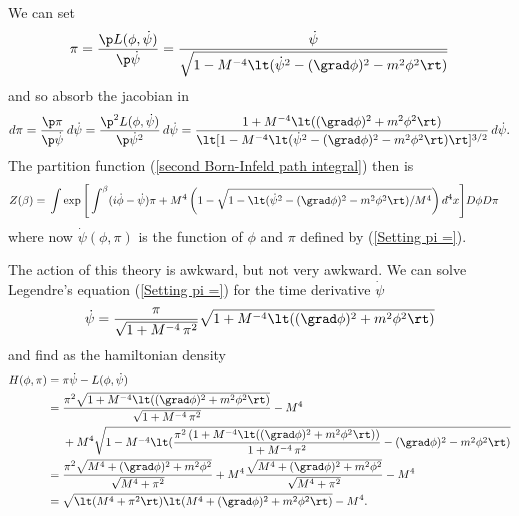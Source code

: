 \documentclass[prd,preprint,floatfix,showpacs]{revtex4-1}
\begin{document}
\par
We can set
\begin{equation}
\pi ={} \frac{ \p  L(\phi, \dot \psi)  }{ \p \dot \psi } = 
\frac{\dot \psi}
{\sqrt{ 1-  M^{-4} \lt(\dot \psi^2 
- (\grad \phi)^2 - m^2 \phi^2 \rt) }}
\label {Setting pi =}
\end{equation}
and so absorb the jacobian in
\begin{equation}
d\pi ={} \frac{\p \pi}{\p \dot \psi} \, d \dot \psi
= \frac{ \p^2  L(\phi, \dot \psi) }{ \p \dot \psi^2  } \, d \dot \psi
={} \frac{1 + M^{-4}\lt((\grad \phi)^2 + m^2 \phi^2\rt)}
{\lt[ 1-  M^{-4} \lt(\dot \psi^2 
- (\grad \phi)^2 - m^2 \phi^2 \rt) \rt]^{3/2} } 
\, d \dot \psi  .
\label {we have}
\end{equation}
The partition function 
(\ref {second Born-Infeld path integral}) 
then is
\begin{equation}
   \begin{split}
Z(\beta)  
= {}& \int \exp \Bigg[ \int^\beta 
( i \dot \phi - \dot \psi ) \pi
 + M^4 \left( 1 - 
\sqrt{ 1-  
\lt(\dot \psi^2 
- (\grad \phi)^2 - m^2 \phi^2 \rt)/M^4 } \right)
d^4x \Bigg]  D\phi D \pi 
\label {third Born-Infeld path integral}
   \end{split}
\end{equation}
where now \( \dot \psi(\phi,\pi) \) 
is the function of \( \phi \) and \( \pi \)
defined by (\ref {Setting pi =})\@.
\par
The action of this theory is awkward, but not very awkward.
We can solve Legendre's equation
(\ref {Setting pi =})
for the time derivative \( \dot \psi \)
\begin{equation}
\dot \psi = \frac{\pi}{\sqrt{1 + M^{-4} \, \pi^2}}
\sqrt{1 + M^{-4} 
\lt( (\grad \phi)^2 + m^2 \phi^2 \rt)}  
\label {dot psi}
\end{equation}
and find as the hamiltonian density
\begin{equation}
   \begin{split}
H(\phi,\pi) = {}& \pi \dot \psi - L(\phi, \dot \psi) 
\\
={}& \frac{\pi^2\sqrt{1 + M^{-4} 
\lt( (\grad \phi)^2 + m^2 \phi^2 \rt)}}
{\sqrt{1 + M^{-4} \, \pi^2}} - M^4
\\
{}& + M^4
\sqrt{ 1-  M^{-4}
\lt( \frac{\pi^2 \left(1 + M^{-4} 
\lt( (\grad \phi)^2 + m^2 \phi^2 \rt)\right)}{1 + M^{-4} \, \pi^2}
- (\grad \phi)^2 - m^2 \phi^2 \rt) } 
\\
={}&  \frac{\pi^2\sqrt{M^4 +  (\grad \phi)^2 + m^2 \phi^2 }}
{\sqrt{M^4 + \pi^2}}
+ M^4 \frac{\sqrt{M^4 + (\grad \phi)^2 + m^2 \phi^2}}
{\sqrt{M^4 + \pi^2}} - M^4
\\
= {}& \sqrt{\lt(M^4 + \pi^2\rt)
\lt(M^4 + (\grad \phi)^2 + m^2 \phi^2\rt)}  - M^4 .
\label {H1}
   \end{split}
\end{equation}
\end{document}
